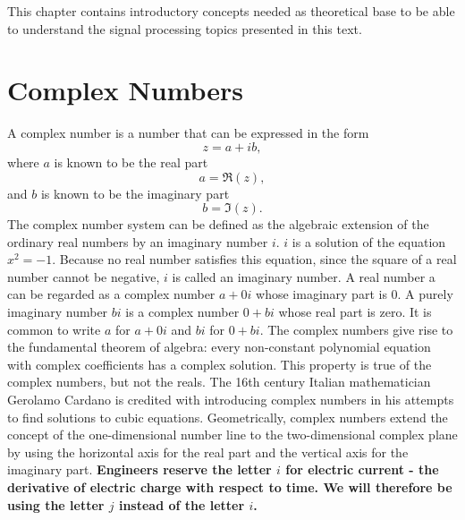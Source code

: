 \documentclass[12pt,oneside,openany]{memoir}
\numberwithin{equation}{subsection}
\begin{document}
This chapter contains introductory concepts needed as theoretical base to be able to understand the signal processing topics presented in this text.


\section{Complex Numbers}
A complex number is a number that can be expressed in the form
\[z = a + ib,\]
where \(a\) is known to be the real part
\[a = \Re(z),\]
and \(b\) is known to be the imaginary part
\[b = \Im(z).\]
The complex number system can be defined as the algebraic extension of the ordinary real numbers by an imaginary number \(i\). \(i\) is a solution of the equation \(x^2 = −1\). Because no real number satisfies this equation, since the square of a real number cannot be negative, \(i\) is called an imaginary number.
\bigbreak
A real number a can be regarded as a complex number \(a + 0i\) whose imaginary part is \(0\). A purely imaginary number \(bi\) is a complex number \(0 + bi\) whose real part is zero. It is common to write \(a\) for \(a + 0i\) and \(bi\) for \(0 + bi\).
\bigbreak
The complex numbers give rise to the fundamental theorem of algebra: every non-constant polynomial equation with complex coefficients has a complex solution. This property is true of the complex numbers, but not the reals. The 16th century Italian mathematician Gerolamo Cardano is credited with introducing complex numbers in his attempts to find solutions to cubic equations.
\bigbreak
Geometrically, complex numbers extend the concept of the one-dimensional number line to the two-dimensional complex plane by using the horizontal axis for the real part and the vertical axis for the imaginary part.
\bigbreak
\textbf{Engineers reserve the letter \(i\) for electric current - the derivative of electric charge with respect to time. We will therefore be using the letter \(j\) instead of the letter \(i\).}
\end{document}
